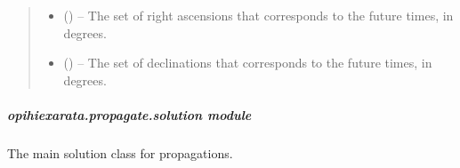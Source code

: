 \documentclass[letterpaper,11pt,english]{sphinxmanual}
\begin{document}
\begin{savenotes}
\begin{fulllineitems}
\begin{savenotes}
\begin{fulllineitems}
\begin{quote}
\begin{description}
\sphinxAtStartPar
\begin{itemize}
\item {} 
\sphinxAtStartPar
{} () – The set of right ascensions that corresponds to the future times,
in degrees.

\item {} 
\sphinxAtStartPar
{} () – The set of declinations that corresponds to the future times, in
degrees.

\end{itemize}


\end{description}\end{quote}

\end{fulllineitems}\end{savenotes}


\end{fulllineitems}\end{savenotes}


\sphinxstepscope


\subparagraph{opihiexarata.propagate.solution module}
\label{\detokenize{code/opihiexarata.propagate.solution:module-opihiexarata.propagate.solution}}\label{\detokenize{code/opihiexarata.propagate.solution:opihiexarata-propagate-solution-module}}\label{\detokenize{code/opihiexarata.propagate.solution::doc}}
\sphinxAtStartPar
The main solution class for propagations.
\end{document}
